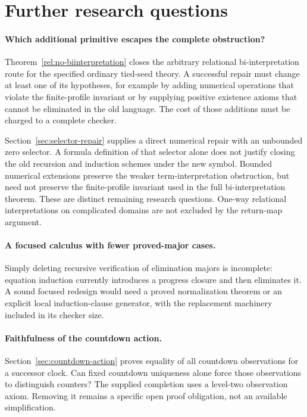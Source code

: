 \documentclass[11pt,letterpaper]{article}
\theoremstyle{definition}\newtheorem{definition}[theorem]{Definition}
\theoremstyle{remark}\newtheorem{remark}[theorem]{Remark}
\begin{document}
\section{Further research questions}
\label{sec:further}

\paragraph{Which additional primitive escapes the complete obstruction?}
Theorem~\ref{rel:no-biinterpretation} closes the arbitrary relational
bi-interpretation route for the specified ordinary tied-seed theory.
A successful repair must change at least one of its hypotheses, for
example by adding numerical operations that violate the finite-profile
invariant or by supplying positive existence axioms that cannot be
eliminated in the old language. The cost of those additions must be
charged to a complete checker.

Section~\ref{sec:selector-repair} supplies a direct numerical repair
with an unbounded zero selector. A formula definition of that selector
alone does not justify closing the old recursion and induction schemes
under the new symbol. Bounded numerical extensions preserve the weaker
term-interpretation obstruction, but need not preserve the finite-profile
invariant used in the full bi-interpretation theorem. These are distinct
remaining research questions. One-way relational interpretations on
complicated domains are not excluded by the return-map argument.

\paragraph{A focused calculus with fewer proved-major cases.}
Simply deleting recursive verification of elimination majors is
incomplete: equation induction currently introduces a progress closure
and then eliminates it. A sound focused redesign would need a proved
normalization theorem or an explicit local induction-clause generator,
with the replacement machinery included in its checker size.

\paragraph{Faithfulness of the countdown action.}
Section~\ref{sec:countdown-action} proves equality of all countdown
observations for a successor clock. Can fixed countdown uniqueness
alone force those observations to distinguish counters? The supplied
completion uses a level-two observation axiom. Removing it remains a
specific open proof obligation, not an available simplification.
\end{document}
